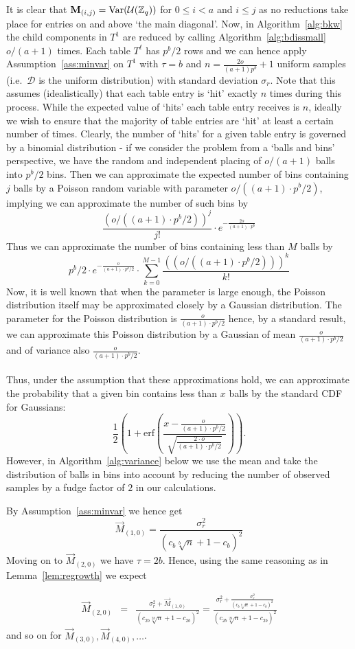It is clear that $\mathbf{M}_{(i,j)} = \textnormal{Var}(\mathcal{U}(\mathbb{Z}_q))$ for $0 \leq i < a$ and $i \leq j$ as no reductions take place for entries on and above `the main diagonal'. Now, in Algorithm~\ref{alg:bkw} the child components in $T^1$ are reduced by calling Algorithm~\ref{alg:bdissmall} $o/(a+1)$ times. Each table $T^\ell$ has $p^b/2$ rows and we can hence apply Assumption~\ref{ass:minvar} on $T^1$ with $\tau = b$ and $n = \frac{2o}{(a+1)p^b} + 1$ uniform samples (i.e.\ $\mathcal{D}$ is the uniform distribution) with standard deviation $\sigma_r$. Note that this assumes (idealistically) that each table entry is `hit' exactly $n$ times during this process. While the expected value of `hits' each table entry receives is $n$, ideally we wish to ensure that the majority of table entries are `hit' at least a certain number of times. Clearly, the number of `hits' for a given table entry is governed by a binomial distribution - if we consider the problem from a `balls and bins' perspective, we have the random and independent placing of $o/(a+1)$ balls into $p^b/2$ bins. Then we can approximate the expected number of bins containing $j$ balls by a Poisson random variable with parameter $o/((a+1)\cdot p^b/2)$, implying we can approximate the number of such bins by
$$
\frac{(o/((a+1)\cdot p^b/2))^j}{j!}\cdot e^{-\frac{2o}{(a+1)\cdot p^b}}
$$
Thus we can approximate the number of bins containing less than $M$ balls by
$$
p^b/2\cdot e^{-\frac{o}{(a+1)\cdot p^b/2}}\cdot\sum_{k=0}^{M-1}{\frac{((o/((a+1)\cdot p^b/2)))^k}{k!}}
$$
Now, it is well known that when the parameter is large enough, the Poisson distribution itself may be approximated closely by a Gaussian distribution. The parameter for the Poisson distribution is $\frac{o}{(a+1)\cdot p^b/2}$ hence, by a standard result, we can approximate this Poisson distribution by a Gaussian of mean $\frac{o}{(a+1)\cdot p^b/2}$ and of variance also $\frac{o}{(a+1)\cdot p^b/2}$.
\\\\
Thus, under the assumption that these approximations hold, we can approximate the probability that a given bin contains less than $x$ balls by the standard CDF for Gaussians:
$$
\frac{1}{2}\left(1+\mathrm{erf}\left(\frac{x-\frac{o}{(a+1)\cdot p^b/2}}{\sqrt{\frac{2\cdot o}{(a+1)\cdot p^b/2}}}\right)\right).
$$
However, in Algorithm~\ref{alg:variance} below we use the mean and take the distribution of balls in bins into account by reducing the number of observed samples by a fudge factor of $2$ in our calculations.

By Assumption~\ref{ass:minvar} we hence get 
$$\vec{M}_{(1,0)} = \frac{\sigma_r^2}{\left(c_b\sqrt[b]{n} + 1 - c_b\right)^2}$$
Moving on to $\vec{M}_{(2,0)}$ we have $\tau = 2b$. Hence, using the same reasoning as in Lemma~\ref{lem:regrowth} we expect

\begin{eqnarray*}
\vec{M}_{(2,0)} &=& \frac{\sigma_r^2  + \vec{M}_{(1,0)}}{\left(c_{2b}\sqrt[2b]{n} + 1-c_{2b}\right)^2} = \frac{\sigma_r^2 + \frac{\sigma_r^2}{\left(c_b\sqrt[b]{n} + 1 - c_b\right)^2}}{\left(c_{2b}\sqrt[2b]{n} + 1 - c_{2b}\right)^2}
\end{eqnarray*}
and so on for $\vec{M}_{(3,0)}, \vec{M}_{(4,0)}, \dots$.